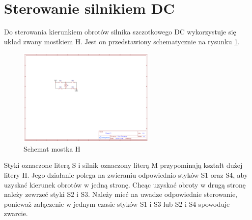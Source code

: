     \section{Sterowanie silnikiem DC}
    	Do sterowania kierunkiem obrotów silnika szczotkowego DC wykorzystuje się układ zwany mostkiem H. Jest on przedstawiony schematycznie na rysunku \ref{fig:mostekHschemat}. 
    	
    	\begin{figure}[ht]
    		\centering
    		\includegraphics[width=0.6\textwidth]{rys02/mostekH.pdf} 
    		\caption{Schemat mostka H}
    		\label{fig:mostekHschemat}
    	\end{figure}
    
    	Styki oznaczone literą S i silnik oznaczony literą M przypominają kształt dużej litery H. Jego działanie polega na zwieraniu odpowiednio styków S1 oraz S4, aby uzyskać kierunek obrotów w jedną stronę. Chcąc uzyskać obroty w drugą stronę należy zewrzeć styki S2 i S3. Należy mieć na uwadze odpowiednie sterowanie, ponieważ załączenie w jednym czasie styków S1 i S3 lub S2 i S4 spowoduje zwarcie.
    	
